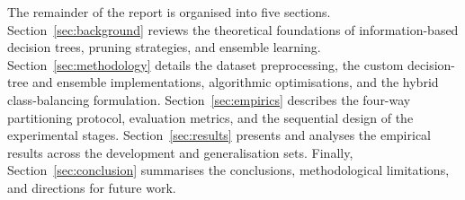 The remainder of the report is organised into five sections. Section~\ref{sec:background} reviews the theoretical foundations of information-based decision trees, pruning strategies, and ensemble learning. Section~\ref{sec:methodology} details the dataset preprocessing, the custom decision-tree and ensemble implementations, algorithmic optimisations, and the hybrid class-balancing formulation. Section~\ref{sec:empirics} describes the four-way partitioning protocol, evaluation metrics, and the sequential design of the experimental stages. Section~\ref{sec:results} presents and analyses the empirical results across the development and generalisation sets. Finally, Section~\ref{sec:conclusion} summarises the conclusions, methodological limitations, and directions for future work.
